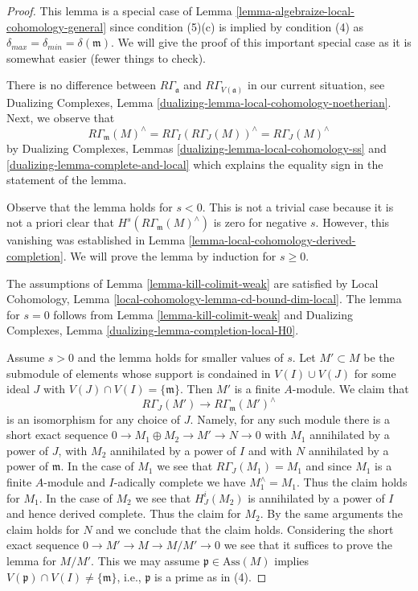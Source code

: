\begin{proof}
This lemma is a special case of
Lemma \ref{lemma-algebraize-local-cohomology-general}
since condition (5)(c) is implied by condition (4)
as $\delta_{max} = \delta_{min} = \delta(\mathfrak m)$.
We will give the proof of this important special case
as it is somewhat easier (fewer things to check).

\medskip\noindent
There is no difference between $R\Gamma_\mathfrak a$ and
$R\Gamma_{V(\mathfrak a)}$ in our current situation, see
Dualizing Complexes, Lemma \ref{dualizing-lemma-local-cohomology-noetherian}.
Next, we observe that
$$
R\Gamma_\mathfrak m(M)^\wedge =
R\Gamma_I(R\Gamma_J(M))^\wedge =
R\Gamma_J(M)^\wedge
$$
by Dualizing Complexes, Lemmas \ref{dualizing-lemma-local-cohomology-ss} and
\ref{dualizing-lemma-complete-and-local}
which explains the equality sign in the statement of the lemma.

\medskip\noindent
Observe that the lemma holds for $s < 0$. This is not a trivial case because
it is not a priori clear that $H^s(R\Gamma_\mathfrak m(M)^\wedge)$
is zero for negative $s$. However, this vanishing was established
in Lemma \ref{lemma-local-cohomology-derived-completion}.
We will prove the lemma by induction for $s \geq 0$.

\medskip\noindent
The assumptions of Lemma \ref{lemma-kill-colimit-weak}
are satisfied by Local Cohomology, Lemma
\ref{local-cohomology-lemma-cd-bound-dim-local}.
The lemma for $s = 0$ follows from Lemma \ref{lemma-kill-colimit-weak} and
Dualizing Complexes, Lemma \ref{dualizing-lemma-completion-local-H0}.

\medskip\noindent
Assume $s > 0$ and the lemma holds for smaller values of $s$.
Let $M' \subset M$ be the submodule of elements whose
support is condained in $V(I) \cup V(J)$ for some
ideal $J$ with $V(J) \cap V(I) = \{\mathfrak m\}$.
Then $M'$ is a finite $A$-module.
We claim that
$$
R\Gamma_J(M') \to R\Gamma_\mathfrak m(M')^\wedge
$$
is an isomorphism for any choice of $J$.
Namely, for any such module there is a short exact sequence
$0 \to M_1 \oplus M_2 \to M' \to N \to 0$ with
$M_1$ annihilated by a power of $J$, with $M_2$ annihilated
by a power of $I$ and with $N$ annihilated by a power of $\mathfrak m$.
In the case of $M_1$ we see that $R\Gamma_J(M_1) = M_1$ and
since $M_1$ is a finite $A$-module and $I$-adically complete
we have $M_1^\wedge = M_1$. Thus the claim holds for $M_1$.
In the case of $M_2$ we see that $H^i_J(M_2)$ is annihilated
by a power of $I$ and hence derived complete. Thus the claim
for $M_2$. By the same arguments the claim holds for $N$
and we conclude that the claim holds. Considering the
short exact sequence $0 \to M' \to M \to M/M' \to 0$
we see that it suffices to prove the lemma for $M/M'$.
This we may assume $\mathfrak p \in \text{Ass}(M)$
implies $V(\mathfrak p) \cap V(I) \not = \{\mathfrak m\}$, i.e.,
$\mathfrak p$ is a prime as in (4).


\end{proof}
